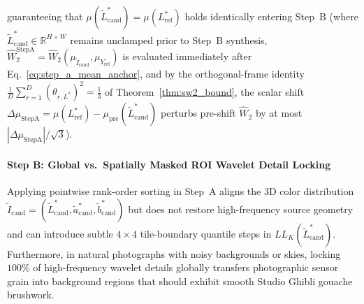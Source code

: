\documentclass[conference,10pt]{IEEEtran}
\begin{document}
guaranteeing that $\mu(\widetilde{L}^*_{\text{cand}}) = \mu(L^*_{\text{ref}})$ holds identically entering Step~B (where $\widetilde{L}^*_{\text{cand}} \in \mathbb{R}^{H \times W}$ remains unclamped prior to Step~B synthesis, $\widehat{W}_2^{\text{StepA}} = \widehat{W}_2(\mu_{\widetilde{I}_{\text{cand}}}, \mu_{Y_{\text{ref}}})$ is evaluated immediately after Eq.~\ref{eq:step_a_mean_anchor}, and by the orthogonal-frame identity $\frac{1}{D}\sum_{r=1}^D (\theta_{r,L^*})^2 = \frac{1}{3}$ of Theorem~\ref{thm:sw2_bound}, the scalar shift $\Delta\mu_{\text{StepA}} = \mu(L^*_{\text{ref}}) - \mu_{\text{pre}}(\widetilde{L}^*_{\text{cand}})$ perturbs pre-shift $\widehat{W}_2$ by at most $|\Delta\mu_{\text{StepA}}|/\sqrt{3}$).

\paragraph{Step B: Global vs.\ Spatially Masked ROI Wavelet Detail Locking}
Applying pointwise rank-order sorting in Step~A aligns the 3D color distribution $\widetilde{I}_{\text{cand}} = (\widetilde{L}^*_{\text{cand}}, \widetilde{a}^*_{\text{cand}}, \widetilde{b}^*_{\text{cand}})$ but does not restore high-frequency source geometry and can introduce subtle $4\times 4$ tile-boundary quantile steps in $LL_K(\widetilde{L}^*_{\text{cand}})$. Furthermore, in natural photographs with noisy backgrounds or skies, locking $100\%$ of high-frequency wavelet details globally transfers photographic sensor grain into background regions that should exhibit smooth Studio Ghibli gouache brushwork.
\end{document}
